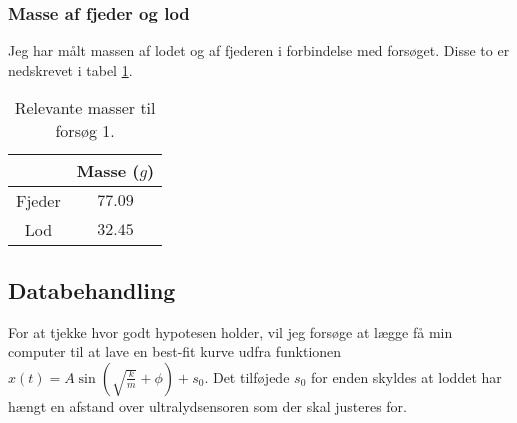 \subsubsection{Masse af fjeder og lod}
Jeg har målt massen af lodet og af fjederen i forbindelse med forsøget. 
Disse to er nedskrevet i tabel \ref{tabel: Masser forsog 1}.
\begin{table}[h]
\centering
\begin{tabular}{|c|c|}
\hline 
 & Masse ($g$) \\ 
\hline 
Fjeder & $77.09$ \\ 
\hline 
Lod & $32.45$ \\ 
\hline 
\end{tabular} 
\caption{Relevante masser til forsøg 1.}
\label{tabel: Masser forsog 1}
\end{table}

\subsection{Databehandling}
For at tjekke hvor godt hypotesen holder, vil jeg forsøge at lægge få min computer til at lave en best-fit kurve udfra funktionen $x(t)=A\sin (\sqrt{\frac{k}{m}}+\phi) + s_0$.
Det tilføjede $s_0$ for enden skyldes at loddet har hængt en afstand over ultralydsensoren som der skal justeres for. 


